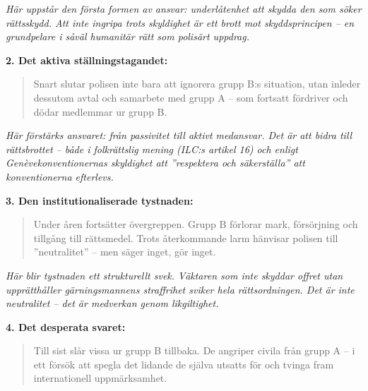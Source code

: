 \textit{Här uppstår den första formen av ansvar: underlåtenhet att skydda den som söker rättsskydd. Att inte ingripa trots skyldighet är ett brott mot skyddsprincipen – en grundpelare i såväl humanitär rätt som polisärt uppdrag.}

\textbf{2. Det aktiva ställningstagandet:}
\begin{quote}
Snart slutar polisen inte bara att ignorera grupp B:s situation, utan inleder dessutom avtal och samarbete med grupp A – som fortsatt fördriver och dödar medlemmar ur grupp B.
\end{quote}

\textit{Här förstärks ansvaret: från passivitet till aktivt medansvar. Det är att bidra till rättsbrottet – både i folkrättslig mening (ILC:s artikel 16) och enligt Genèvekonventionernas skyldighet att ”respektera och säkerställa” att konventionerna efterlevs.}

\textbf{3. Den institutionaliserade tystnaden:}
\begin{quote}
Under åren fortsätter övergreppen. Grupp B förlorar mark, försörjning och tillgång till rättsmedel. Trots återkommande larm hänvisar polisen till ”neutralitet” – men säger inget, gör inget.
\end{quote}

\textit{Här blir tystnaden ett strukturellt svek. Väktaren som inte skyddar offret utan upprätthåller gärningsmannens straffrihet sviker hela rättsordningen. Det är inte neutralitet – det är medverkan genom likgiltighet.}

\textbf{4. Det desperata svaret:}
\begin{quote}
Till sist slår vissa ur grupp B tillbaka. De angriper civila från grupp A – i ett försök att spegla det lidande de själva utsatts för och tvinga fram internationell uppmärksamhet.
\end{quote}

